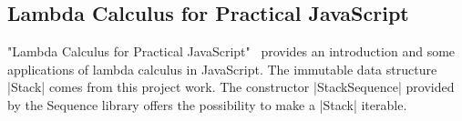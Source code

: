 \subsection{Lambda Calculus for Practical JavaScript} %
\label{sub:Lambda Calculus for Practical JavaScript}
"Lambda Calculus for Practical JavaScript"~\cite{andermatt_lambda_2022}
provides an introduction and some applications of lambda calculus in
JavaScript. The immutable data structure |Stack| comes from this project
work. The constructor |StackSequence| provided by the Sequence library offers
the possibility to make a |Stack| iterable. 
